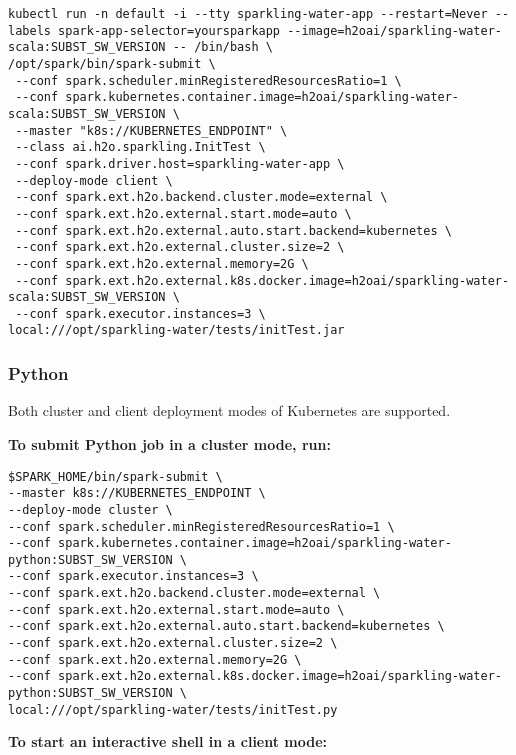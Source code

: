 \begin{lstlisting}[style=Bash]
kubectl run -n default -i --tty sparkling-water-app --restart=Never --labels spark-app-selector=yoursparkapp --image=h2oai/sparkling-water-scala:SUBST_SW_VERSION -- /bin/bash \
/opt/spark/bin/spark-submit \
 --conf spark.scheduler.minRegisteredResourcesRatio=1 \
 --conf spark.kubernetes.container.image=h2oai/sparkling-water-scala:SUBST_SW_VERSION \
 --master "k8s://KUBERNETES_ENDPOINT" \
 --class ai.h2o.sparkling.InitTest \
 --conf spark.driver.host=sparkling-water-app \
 --deploy-mode client \
 --conf spark.ext.h2o.backend.cluster.mode=external \
 --conf spark.ext.h2o.external.start.mode=auto \
 --conf spark.ext.h2o.external.auto.start.backend=kubernetes \
 --conf spark.ext.h2o.external.cluster.size=2 \
 --conf spark.ext.h2o.external.memory=2G \
 --conf spark.ext.h2o.external.k8s.docker.image=h2oai/sparkling-water-scala:SUBST_SW_VERSION \
 --conf spark.executor.instances=3 \
local:///opt/sparkling-water/tests/initTest.jar
\end{lstlisting}

\subsubsection{Python}

Both cluster and client deployment modes of Kubernetes are supported.

\textbf{To submit Python job in a cluster mode, run:}

\begin{lstlisting}[style=Bash]
$SPARK_HOME/bin/spark-submit \
--master k8s://KUBERNETES_ENDPOINT \
--deploy-mode cluster \
--conf spark.scheduler.minRegisteredResourcesRatio=1 \
--conf spark.kubernetes.container.image=h2oai/sparkling-water-python:SUBST_SW_VERSION \
--conf spark.executor.instances=3 \
--conf spark.ext.h2o.backend.cluster.mode=external \
--conf spark.ext.h2o.external.start.mode=auto \
--conf spark.ext.h2o.external.auto.start.backend=kubernetes \
--conf spark.ext.h2o.external.cluster.size=2 \
--conf spark.ext.h2o.external.memory=2G \
--conf spark.ext.h2o.external.k8s.docker.image=h2oai/sparkling-water-python:SUBST_SW_VERSION \
local:///opt/sparkling-water/tests/initTest.py
\end{lstlisting}

\textbf{To start an interactive shell in a client mode:}

